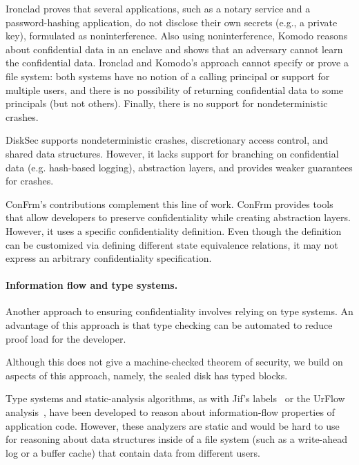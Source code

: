 Ironclad proves that several applications, such as a notary service and a password-hashing application, do not disclose their own secrets (e.g., a private key), formulated as noninterference. Also using noninterference, Komodo \cite{17} reasons about confidential data in an enclave and shows that an adversary cannot learn the confidential data. Ironclad and Komodo’s approach cannot specify or prove a file system: both systems have no notion of a calling principal or support for multiple users, and there is no possibility of returning confidential data to some principals (but not others). Finally, there is no support for nondeterministic crashes.

DiskSec supports nondeterministic crashes, discretionary access control, and shared data structures. However, it lacks support for branching on confidential data (e.g. hash-based logging), abstraction layers, and provides weaker guarantees for crashes.

ConFrm's contributions complement this line of work. ConFrm provides tools that allow developers to preserve confidentiality while creating abstraction layers. However, it uses a specific confidentiality definition. Even though the definition can be customized via defining different state equivalence relations, it may not express an arbitrary confidentiality specification.

\paragraph{Information flow and type systems.} 

Another approach to ensuring confidentiality involves relying on type systems. An advantage of this approach is that type checking can be automated to reduce proof load for the developer. 


Although this does not give a machine-checked theorem of security,
we build on aspects of this approach, namely, the sealed disk has
typed blocks.

Type systems and static-analysis algorithms, as with Jif's labels~\cite{myers:jif, myers:jflow97}
or the UrFlow analysis~\cite{chlipala:urflow}, have been developed to reason about
information-flow properties of application code.  However, these analyzers
are static and would be hard to use for reasoning
about data structures inside of a file system (such as a
write-ahead log or a buffer cache) that contain data from different users.

